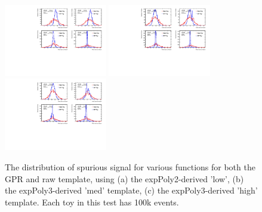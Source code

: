 \begin{figure} 
\begin{center}
  \includegraphics[width=0.4\textwidth]{figures/background/gpr/validation/nominal/ToyTest_FitSigVals_lowpT_100k_noSig}   
  \includegraphics[width=0.4\textwidth]{figures/background/gpr/validation/nominal/ToyTest_FitSigVals_medpT_100k_noSig}   
  \includegraphics[width=0.4\textwidth]{figures/background/gpr/validation/nominal/ToyTest_FitSigVals_highpT_100k_noSig}   
\caption{The distribution of spurious signal for various functions for both the GPR and raw template, using (a) the expPoly2-derived 'low', (b) the expPoly3-derived 'med' template, (c) the expPoly3-derived 'high' template. Each toy in this test has 100k events.}
\label{fig:lowpt_100k_noSig}
\end{center}
\end{figure}


